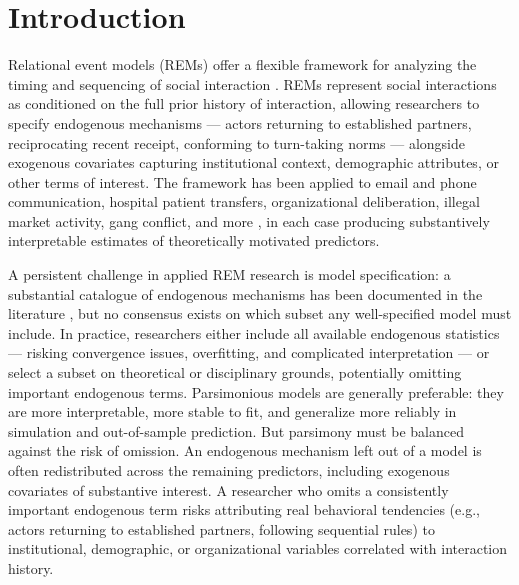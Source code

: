 \documentclass[11pt]{article}
\begin{document}
\newpage

\section{Introduction}

Relational event models (REMs) offer a flexible framework for analyzing
the timing and sequencing of social interaction \citep{butts_sm_2008}.
REMs represent social interactions as conditioned on the full prior history of
interaction, allowing researchers to specify endogenous mechanisms ---
actors returning to established partners, reciprocating recent receipt,
conforming to turn-taking norms --- alongside exogenous covariates
capturing institutional context, demographic attributes, or other terms of interest. The
framework has been applied to email and phone communication, hospital
patient transfers, organizational deliberation, illegal market activity,
gang conflict, and more \citep{vu2017relational,kitts2017investigating,%
liang2014organizational,duxbury2021shining,gravel2023rivalries,%
renshaw2023modeling}, in each case producing substantively interpretable
estimates of theoretically motivated predictors.

A persistent challenge in applied REM research is model specification:
a substantial catalogue of endogenous mechanisms has been documented in
the literature \citep{butts2023relational}, but no consensus exists on
which subset any well-specified model must include. In practice,
researchers either include all available endogenous statistics --- risking
convergence issues, overfitting, and complicated interpretation --- or
select a subset on theoretical or disciplinary grounds, potentially omitting important endogenous terms.
Parsimonious models are generally preferable: they are more interpretable, more stable to fit, and
generalize more reliably in simulation and out-of-sample prediction.
But parsimony must be balanced against the risk of omission. An
endogenous mechanism left out of a model is often redistributed across the remaining predictors,
including exogenous covariates of substantive interest. A researcher
who omits a consistently important endogenous term risks attributing
real behavioral tendencies (e.g., actors returning to established partners,
following sequential rules) to institutional, demographic, or
organizational variables correlated with interaction history.
\end{document}

